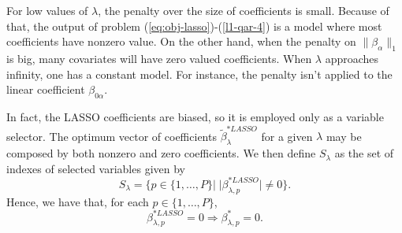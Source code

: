 
For low values of $\lambda$, the penalty over the size of coefficients is small. Because of that, the output of problem (\ref{eq:obj-lasso})-(\ref{l1-qar-4}) is a model where most coefficients have nonzero value. On the other hand, when the penalty on $\| \beta_\alpha \|_1$ is big, many covariates will have zero valued coefficients. When $\lambda$ approaches infinity, one has a constant model. 
For instance, the penalty isn't applied to the linear coefficient $\beta_{0\alpha}$. 

In fact, the LASSO coefficients are biased, so it is employed only as a variable selector. 
The optimum vector of coefficients $\tilde \beta_\lambda^{*LASSO}$ for a given $\lambda$ may be composed by both nonzero and zero coefficients. 
We then define $S_\lambda$ as the set of indexes of selected variables given by
\begin{equation*}
S_\lambda = \{ p \in \{ 1,\dots,P \} | \; |\beta^{*LASSO}_{\lambda,p}| \neq 0  \}.
\end{equation*}
Hence, we have that, for each $p \in \{ 1,\dots,P \}$,
$$\beta^{*LASSO}_{\lambda,p} = 0 \Longrightarrow \beta^{*}_{\lambda,p} = 0.$$

